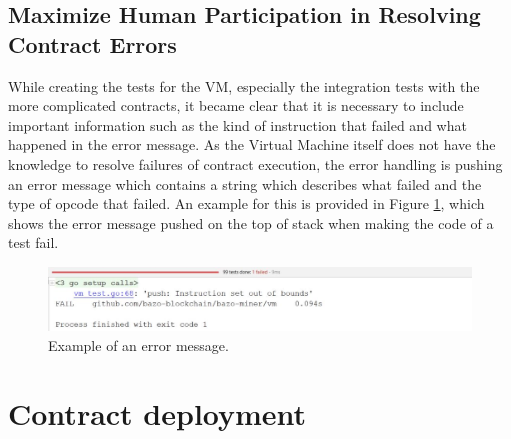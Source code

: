 \subsection{Maximize Human Participation in Resolving Contract Errors}
While creating the tests for the VM, especially the integration tests with the more complicated contracts, it became clear that it is necessary to include important information such as the kind of instruction that failed and what happened in the error message. As the Virtual Machine itself does not have the knowledge to resolve failures of contract execution, the error handling is pushing an error message which contains a string which describes what failed and the type of opcode that failed. An example for this is provided in Figure \ref{pushtestfailure}, which shows the error message pushed on the top of stack when making the code of a test fail.

\begin{figure}[H]
	\begin{center}
	\includegraphics[width=\textwidth]{./images/push-test-failure}
	\caption{Example of an error message.}
	\label{pushtestfailure}
	\end{center}
\end{figure}

\section{Contract deployment}

